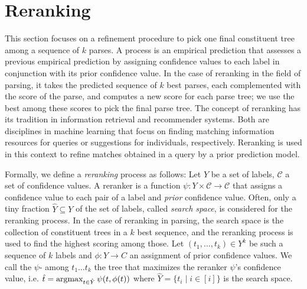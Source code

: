 \documentclass[../../document.tex]{subfiles}
\begin{document}
    \section{Reranking}
    This section focuses on a refinement procedure to pick one final constituent tree among a sequence of \(k\) parses.
    A  process is an empirical prediction that assesses a previous empirical prediction by assigning confidence values to each label in conjunction with its prior confidence value.
    In the case of reranking in the field of parsing, it takes the predicted sequence of \(k\) best parses, each complemented with the score of the parse, and computes a new score for each parse tree; we use the best among these scores to pick the final parse tree.
    The concept of reranking has its tradition in information retrieval and recommender systems. Both are disciplines in machine learning that focus on finding matching information resources for queries or suggestions for individuals, respectively.
    Reranking is used in this context to refine matches obtained in a query by a prior prediction model. \citep{carbonell1998use,adomavicius2009toward}
    
    Formally, we define a \emph{reranking} process as follows:
        Let \(Y\) be a set of labels, \(\mathcal{C}\) a set of confidence values.
        A reranker is a function \(\psi \colon Y \times \mathcal{C} \to \mathcal{C}\) that assigns a confidence value to each pair of a label and \emph{prior} confidence value.
    Often, only a tiny fraction \(\hat{Y} \subseteq Y\) of the set of labels, called \emph{search space}, is considered for the reranking process.
    In the case of reranking in parsing, the search space is the collection of constituent trees in a \(k\) best sequence, and the reranking process is used to find the highest scoring among those.
    Let \((t_1, \ldots, t_k) \in Y^k\) be such a sequence of \(k\) labels and \(\phi \colon Y \to C\) an assignment of prior confidence values.
    We call the \(\psi\)- among \(t_1 \ldots t_k\) the tree that maximizes the reranker \(\psi\)'s confidence value, i.e. \(
        \hat{t} = \operatorname{arg max}_{t \in \hat{Y}} \psi(t, \phi(t))
    \) where \(\hat{Y} = \{t_i \mid i \in [i]\}\) is the search space.
    
\end{document}
